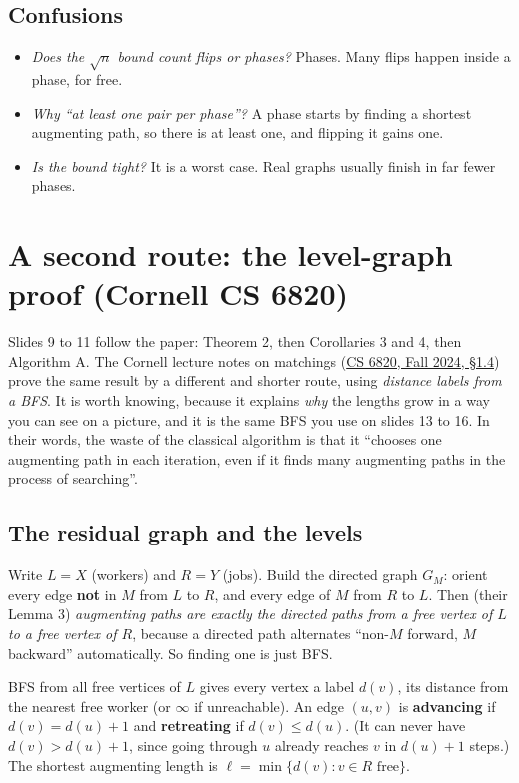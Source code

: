 \documentclass[11pt,a4paper]{article}
\begin{document}
\subsection*{Confusions}
\begin{itemize}
  \item \emph{Does the $\sqrt n$ bound count flips or phases?} Phases. Many flips happen inside a phase, for free.
  \item \emph{Why ``at least one pair per phase''?} A phase starts by finding a shortest augmenting path, so there is at least one, and flipping it gains one.
  \item \emph{Is the bound tight?} It is a worst case. Real graphs usually finish in far fewer phases.
\end{itemize}

\section{A second route: the level-graph proof (Cornell CS 6820)}
Slides 9 to 11 follow the paper: Theorem 2, then Corollaries 3 and 4, then Algorithm A. The Cornell lecture notes on matchings (\href{https://www.cs.cornell.edu/courses/cs6820/2024fa/handouts/matchings.pdf}{CS 6820, Fall 2024, \S1.4}) prove the same result by a different and shorter route, using \emph{distance labels from a BFS}. It is worth knowing, because it explains \emph{why} the lengths grow in a way you can see on a picture, and it is the same BFS you use on slides 13 to 16. In their words, the waste of the classical algorithm is that it ``chooses one augmenting path in each iteration, even if it finds many augmenting paths in the process of searching''.

\subsection*{The residual graph and the levels}
Write $L=X$ (workers) and $R=Y$ (jobs). Build the directed graph $G_M$: orient every edge \textbf{not} in $M$ from $L$ to $R$, and every edge of $M$ from $R$ to $L$. Then (their Lemma 3) \emph{augmenting paths are exactly the directed paths from a free vertex of $L$ to a free vertex of $R$}, because a directed path alternates ``non-$M$ forward, $M$ backward'' automatically. So finding one is just BFS.

BFS from all free vertices of $L$ gives every vertex a label $d(v)$, its distance from the nearest free worker (or $\infty$ if unreachable). An edge $(u,v)$ is \textbf{advancing} if $d(v)=d(u)+1$ and \textbf{retreating} if $d(v)\le d(u)$. (It can never have $d(v)>d(u)+1$, since going through $u$ already reaches $v$ in $d(u)+1$ steps.) The shortest augmenting length is $\ell=\min\{d(v):v\in R\text{ free}\}$.
\end{document}
